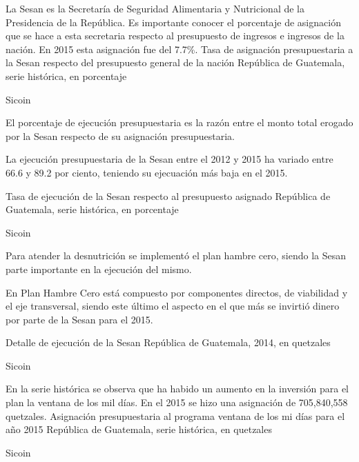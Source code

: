 
{%
	La Sesan es la Secretaría de Seguridad Alimentaria y Nutricional de la Presidencia de la República. Es importante conocer el porcentaje de asignación que se hace a esta secretaria respecto al presupuesto de ingresos e ingresos de la nación. En 2015 esta asignación fue del 7.7\%.  
 }%
{%
 Tasa de asignación presupuestaria a la Sesan respecto del presupuesto general de la nación } %
{%
 República de Guatemala, serie histórica, en porcentaje} %
{%
 \begin{tikzpicture}[x=1pt,y=1pt]    \end{tikzpicture}}%
{%
 Sicoin} %


 {%
 	El porcentaje de ejecución presupuestaria es la razón entre el monto total erogado por la Sesan respecto de su asignación presupuestaria. 
 	
 	La ejecución presupuestaria de la Sesan entre el 2012 y 2015 ha variado entre 66.6 y 89.2 por ciento, teniendo su ejecuación más baja en el 2015.
 }%
 {%
 	Tasa de ejecución de la Sesan respecto al presupuesto asignado } %
 {%
 	República de Guatemala, serie histórica, en porcentaje} %
 {%
 	\begin{tikzpicture}[x=1pt,y=1pt]    \end{tikzpicture}}%
 {%
 	Sicoin} %
 
 
  {%
  	Para atender la desnutrición se implementó el plan hambre cero, siendo la Sesan parte importante en la ejecución del mismo. 
  		
  		En Plan Hambre Cero está compuesto por componentes directos, de viabilidad y el eje transversal, siendo este último el aspecto en el que más se invirtió dinero por parte de la Sesan para el 2015.
  }%
  {%
  	Detalle de ejecución de la Sesan } %
  {%
  	República de Guatemala, 2014, en quetzales} %
  {%
  	\begin{tikzpicture}[x=1pt,y=1pt]    \end{tikzpicture}}%
  {%
  	Sicoin} %
  
  
  
  {%
  	En la serie histórica se observa que ha habido un aumento en la inversión para el plan la ventana de los mil días. En el 2015 se hizo una asignación de 705,840,558 quetzales. 
  }%
  {%
  Asignación presupuestaria al programa ventana de los mi días para el año 2015} %
  {%
  	República de Guatemala, serie histórica, en quetzales} %
  {%
  	\begin{tikzpicture}[x=1pt,y=1pt]    \end{tikzpicture}}%
  {%
  	Sicoin} %
  
